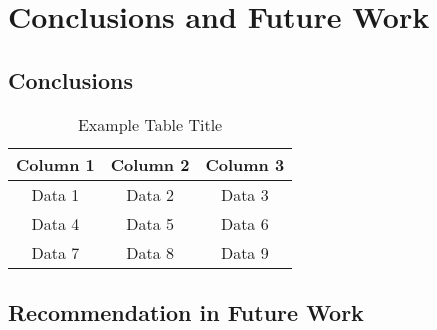 \chapter{Conclusions and Future Work}

\begingroup
\justifying
\setlength{\parindent}{0pt}
\setlength{\parskip}{0.5\baselineskip}
\titlespacing{\chapter}{0pt}{0pt}{0pt}
\titlespacing{\section}{0pt}{0pt}{0pt}

\section{Conclusions}

\begin{table}[h]
    \centering
    \caption{Example Table Title}
    \label{tab:example}
    \begin{tabular}{|c|c|c|}
        \hline
        Column 1 & Column 2 & Column 3 \\ \hline
        Data 1   & Data 2   & Data 3   \\ \hline
        Data 4   & Data 5   & Data 6   \\ \hline
        Data 7   & Data 8   & Data 9   \\ \hline
    \end{tabular}
\end{table}

\section{Recommendation in Future Work}

\endgroup